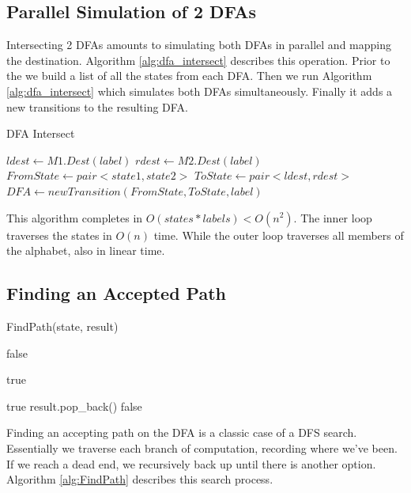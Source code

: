 \documentclass[12pt,journal,compsoc]{IEEEtran}
\theoremstyle{plain}%
\theoremstyle{definition}
\theoremstyle{remark}
\begin{document}
\subsection{Parallel Simulation of 2 DFAs}
Intersecting 2 DFAs amounts to simulating both DFAs in parallel and mapping the
destination. Algorithm \ref{alg:dfa_intersect} describes this operation. Prior
to the we build a list of all the states from each DFA. Then we run Algorithm
\ref{alg:dfa_intersect} which simulates both DFAs simultaneously. Finally it
adds a new transitions to the resulting DFA. 
\begin{algorithm}
    \caption{DFA Intersect}
    \label{alg:dfa_intersect}
\begin{algorithmic}
            \STATE $ldest \gets M1.Dest(label)$
            \STATE $rdest \gets M2.Dest(label)$
            \STATE $FromState \gets pair<state1,state2>$
            \STATE $ToState \gets pair<ldest,rdest>$
            \STATE $DFA \gets new Transition(FromState, ToState, label)$
        \ENDFOR
    \ENDFOR
\end{algorithmic}
\end{algorithm}
This algorithm completes in $O(states * labels) < O(n^2)$. The inner loop traverses the states in
$O(n)$ time.  While the outer loop traverses all members of the alphabet, also
in linear time. 

\subsection{Finding an Accepted Path}
\begin{algorithm}
    \caption{FindPath(state, result)}
    \label{alg:FindPath}
\begin{algorithmic}
        \RETURN false
    \ENDIF

        \RETURN true
    \ENDIF

            \RETURN true
        \ENDIF
    \ENDFOR
    \STATE result.pop\_back()
    \RETURN false
\end{algorithmic}
\end{algorithm}
Finding an accepting path on the DFA is a classic case of a DFS search.
Essentially we traverse each branch of computation, recording where we've been.
If we reach a dead end, we recursively back up until there is another option.
Algorithm \ref{alg:FindPath}  describes this search process. 
\end{document}
